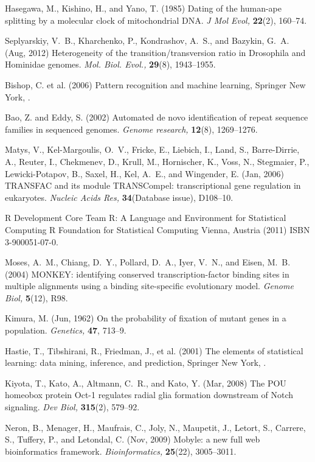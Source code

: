 \documentclass[a4,center,fleqn]{NAR}
\begin{document}
\begin{thebibliography}{10}
Hasegawa, M., Kishino, H., and Yano, T. (1985)
Dating of the human-ape splitting by a molecular clock of mitochondrial DNA.
{\em J Mol Evol,} {\bf 22}(2), 160--74.

Seplyarskiy, V.~B., Kharchenko, P., Kondrashov, A.~S., and Bazykin, G.~A. (Aug,
  2012)
{{H}eterogeneity of the transition/transversion ratio in {D}rosophila and
  {H}ominidae genomes}.
{\em Mol. Biol. Evol.,} {\bf 29}(8), 1943--1955.

Bishop, C. et al. (2006)
Pattern recognition and machine learning,
{S}pringer New York, .

Bao, Z. and Eddy, S. (2002)
{Automated de novo identification of repeat sequence families in sequenced
  genomes}.
{\em Genome research,} {\bf 12}(8), 1269--1276.

Matys, V., Kel-Margoulis, O.~V., Fricke, E., Liebich, I., Land, S.,
  Barre-Dirrie, A., Reuter, I., Chekmenev, D., Krull, M., Hornischer, K., Voss,
  N., Stegmaier, P., Lewicki-Potapov, B., Saxel, H., Kel, A.~E., and Wingender,
  E. (Jan, 2006)
TRANSFAC and its module TRANSCompel: transcriptional gene regulation in
  eukaryotes.
{\em Nucleic Acids Res,} {\bf 34}(Database issue), D108--10.

{R Development Core Team}
R: A Language and Environment for Statistical Computing
R Foundation for Statistical Computing Vienna, Austria (2011)
{ISBN} 3-900051-07-0.

Moses, A.~M., Chiang, D.~Y., Pollard, D.~A., Iyer, V.~N., and Eisen, M.~B.
  (2004)
MONKEY: identifying conserved transcription-factor binding sites in multiple
  alignments using a binding site-specific evolutionary model.
{\em Genome Biol,} {\bf 5}(12), R98.

Kimura, M. (Jun, 1962)
On the probability of fixation of mutant genes in a population.
{\em Genetics,} {\bf 47}, 713--9.

Hastie, T., Tibshirani, R., Friedman, J., et al. (2001)
The elements of statistical learning: data mining, inference, and prediction,
Springer New York, .

Kiyota, T., Kato, A., Altmann, C.~R., and Kato, Y. (Mar, 2008)
The POU homeobox protein Oct-1 regulates radial glia formation downstream of
  Notch signaling.
{\em Dev Biol,} {\bf 315}(2), 579--92.

Neron, B., Menager, H., Maufrais, C., Joly, N., Maupetit, J., Letort, S.,
  Carrere, S., Tuffery, P., and Letondal, C. (Nov, 2009)
{{M}obyle: a new full web bioinformatics framework}.
{\em Bioinformatics,} {\bf 25}(22), 3005--3011.


\end{thebibliography}
\end{document}
